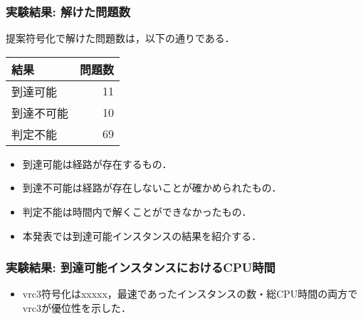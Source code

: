 \documentclass[dvipdfmx,11pt]{beamer}
\begin{document}
\begin{frame}\frametitle{実験結果: 解けた問題数}

提案符号化で解けた問題数は，以下の通りである．
\bigskip

\begin{exampleblock}{}\centering
  \begin{tabular}{l|r}
    結果 & 問題数 \\ \hline
    到達可能 & 11 \\ 
    到達不可能 & 10 \\
    判定不能 & 69 \\ \hline
\end{tabular}
\end{exampleblock}

  
  \begin{itemize}
    \item 到達可能は経路が存在するもの．
    \item 到達不可能は経路が存在しないことが確かめられたもの．
    \item 判定不能は時間内で解くことができなかったもの．
    \item 本発表では到達可能インスタンスの結果を紹介する．
  \end{itemize}

\end{frame}

\begin{frame}\frametitle{実験結果: 到達可能インスタンスにおけるCPU時間}

  \begin{table}[t]
    \centering
      
  \end{table}

  \begin{itemize}
    \item vrc3符号化はxxxxx，最速であったインスタンスの数・総CPU時間の両方で\alert{vrc3が優位性を示した}．
  \end{itemize}
  
\end{frame}

\end{document}
